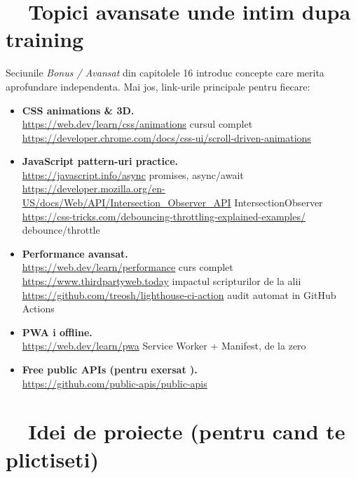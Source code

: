 \section{\faRocket\ \ Topici avansate \textendash{} unde intim dupa training}

Seciunile \emph{Bonus / Avansat} din capitolele 1\textendash{}6 introduc concepte care merita apro\-fundare independenta. Mai jos, link-urile principale pentru fiecare:

\begin{itemize}[itemsep=2pt]
  \item \textbf{CSS animations \& 3D.} \\
  \url{https://web.dev/learn/css/animations} \textendash{} cursul complet \\
  \url{https://developer.chrome.com/docs/css-ui/scroll-driven-animations} \textendash{} 
  \item \textbf{JavaScript \textendash{} pattern-uri practice.} \\
  \url{https://javascript.info/async} \textendash{} promises, async/await \\
  \url{https://developer.mozilla.org/en-US/docs/Web/API/Intersection_Observer_API} \textendash{} IntersectionObserver \\
  \url{https://css-tricks.com/debouncing-throttling-explained-examples/} \textendash{} debounce/throttle
  \item \textbf{Performance avansat.} \\
  \url{https://web.dev/learn/performance} \textendash{} curs complet \\
  \url{https://www.thirdpartyweb.today} \textendash{} impactul scripturilor de la alii \\
  \url{https://github.com/treosh/lighthouse-ci-action} \textendash{} audit automat in GitHub Actions
  \item \textbf{PWA i offline.} \\
  \url{https://web.dev/learn/pwa} \textendash{} Service Worker + Manifest, de la zero
  \item \textbf{Free public APIs (pentru exersat ).} \\
  \url{https://github.com/public-apis/public-apis}
\end{itemize}

\section{\faLightbulb\ \ Idei de proiecte (pentru cand te plictiseti)}

